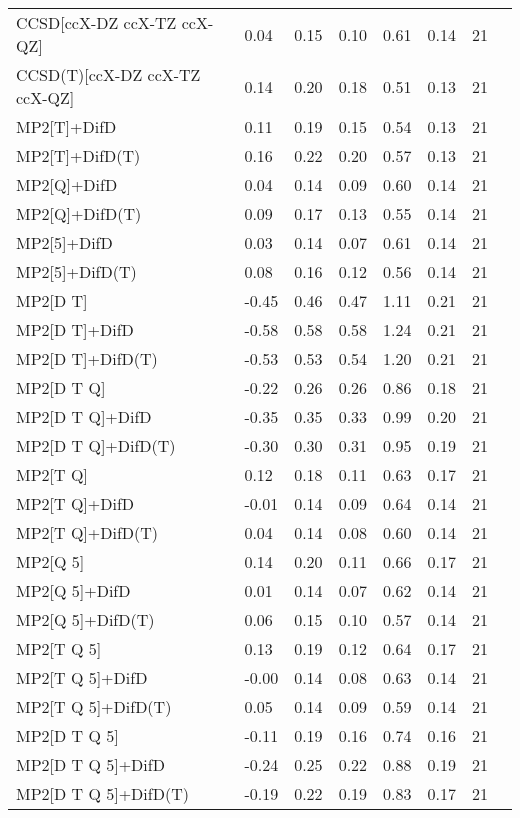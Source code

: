 \begin{table}
\begin{tabular}{l l l l l l l l }
    CCSD[ccX-DZ ccX-TZ ccX-QZ] & 0.04 & 0.15 & 0.10 & 0.61 & 0.14 & 21 \\ 
    CCSD(T)[ccX-DZ ccX-TZ ccX-QZ] & 0.14 & 0.20 & 0.18 & 0.51 & 0.13 & 21 \\ 
    MP2[T]+DifD & 0.11 & 0.19 & 0.15 & 0.54 & 0.13 & 21 \\ 
    MP2[T]+DifD(T) & 0.16 & 0.22 & 0.20 & 0.57 & 0.13 & 21 \\ 
    MP2[Q]+DifD & 0.04 & 0.14 & 0.09 & 0.60 & 0.14 & 21 \\ 
    MP2[Q]+DifD(T) & 0.09 & 0.17 & 0.13 & 0.55 & 0.14 & 21 \\ 
    MP2[5]+DifD & 0.03 & 0.14 & 0.07 & 0.61 & 0.14 & 21 \\ 
    MP2[5]+DifD(T) & 0.08 & 0.16 & 0.12 & 0.56 & 0.14 & 21 \\ 
    MP2[D T] & -0.45 & 0.46 & 0.47 & 1.11 & 0.21 & 21 \\ 
    MP2[D T]+DifD & -0.58 & 0.58 & 0.58 & 1.24 & 0.21 & 21 \\ 
    MP2[D T]+DifD(T) & -0.53 & 0.53 & 0.54 & 1.20 & 0.21 & 21 \\ 
    MP2[D T Q] & -0.22 & 0.26 & 0.26 & 0.86 & 0.18 & 21 \\ 
    MP2[D T Q]+DifD & -0.35 & 0.35 & 0.33 & 0.99 & 0.20 & 21 \\ 
    MP2[D T Q]+DifD(T) & -0.30 & 0.30 & 0.31 & 0.95 & 0.19 & 21 \\ 
    MP2[T Q] & 0.12 & 0.18 & 0.11 & 0.63 & 0.17 & 21 \\ 
    MP2[T Q]+DifD & -0.01 & 0.14 & 0.09 & 0.64 & 0.14 & 21 \\ 
    MP2[T Q]+DifD(T) & 0.04 & 0.14 & 0.08 & 0.60 & 0.14 & 21 \\ 
    MP2[Q 5] & 0.14 & 0.20 & 0.11 & 0.66 & 0.17 & 21 \\ 
    MP2[Q 5]+DifD & 0.01 & 0.14 & 0.07 & 0.62 & 0.14 & 21 \\ 
    MP2[Q 5]+DifD(T) & 0.06 & 0.15 & 0.10 & 0.57 & 0.14 & 21 \\ 
    MP2[T Q 5] & 0.13 & 0.19 & 0.12 & 0.64 & 0.17 & 21 \\ 
    MP2[T Q 5]+DifD & -0.00 & 0.14 & 0.08 & 0.63 & 0.14 & 21 \\ 
    MP2[T Q 5]+DifD(T) & 0.05 & 0.14 & 0.09 & 0.59 & 0.14 & 21 \\ 
    MP2[D T Q 5] & -0.11 & 0.19 & 0.16 & 0.74 & 0.16 & 21 \\ 
    MP2[D T Q 5]+DifD & -0.24 & 0.25 & 0.22 & 0.88 & 0.19 & 21 \\ 
    MP2[D T Q 5]+DifD(T) & -0.19 & 0.22 & 0.19 & 0.83 & 0.17 & 21 \\ 
    \bottomrule
  \end{tabular}
\end{table}
